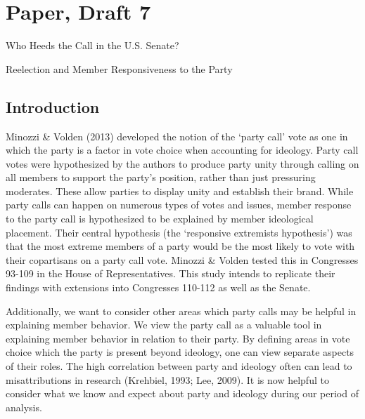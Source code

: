 \documentclass[12pt]{article}
\begin{document}
\doublespacing

\section{Paper, Draft 7}

\begin{center}
	{\Large Who Heeds the Call in the U.S. Senate?}
	
	{\large Reelection and Member Responsiveness to the Party}
\end{center}

\begin{abstract}
	\singlespacing
	\noindent
	In this paper, we replicate the findings of Minozzi \& Volden (2013) with some modifications of their methodology. We show that their hypotheses regarding party unity coming through the party working to unite more extreme (rather than more moderate) members holds not only in the House, but also the Senate. Further, we show the usefulness of separating votes in this way by considering changes in member behavior when they are up for reelection.
\end{abstract}



\subsection{Introduction}

Minozzi \& Volden (2013) developed the notion of the `party call' vote as one in which the party is a factor in vote choice when accounting for ideology. Party call votes were hypothesized by the authors to produce party unity through calling on all members to support the party's position, rather than just pressuring moderates. These allow parties to display unity and establish their brand. While party calls can happen on numerous types of votes and issues, member response to the party call is hypothesized to be explained by member ideological placement. Their central hypothesis (the `responsive extremists hypothesis') was that the most extreme members of a party would be the most likely to vote with their copartisans on a party call vote. Minozzi \& Volden tested this in Congresses 93-109 in the House of Representatives. This study intends to replicate their findings with extensions into Congresses 110-112 as well as the Senate.

Additionally, we want to consider other areas which party calls may be helpful in explaining member behavior. We view the party call as a valuable tool in explaining member behavior in relation to their party. By defining areas in vote choice which the party is present beyond ideology, one can view separate aspects of their roles. The high correlation between party and ideology often can lead to misattributions in research (Krehbiel, 1993; Lee, 2009). It is now helpful to consider what we know and expect about party and ideology during our period of analysis.
\end{document}
